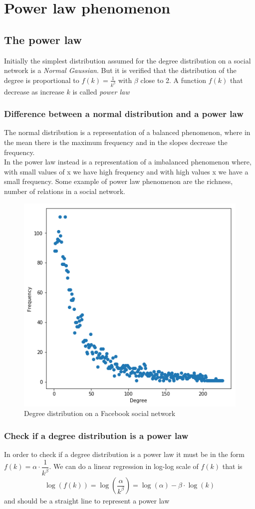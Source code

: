 \chapter{Power law phenomenon}
\section{The power law}
Initially the simplest distribution assumed for the degree distribution on a social network is a \textit{Normal Gaussian}. But it is verified that the distribution of the degree is proportional to $ f(k) = \frac{1}{k^\beta} $ with $ \beta  $ close to 2. A function $ f(k) $ that decrease as increase $ k $ is called \textit{power law}
\subsection{Difference between a normal distribution and a power law}
The normal distribution is a representation of a balanced phenomenon, where in the mean there is the maximum frequency and in the slopes decrease the frequency.\\
In the power law instead is a representation of a imbalanced phenomenon where, with small values of x we have high frequency and with high values x we have a small frequency. Some example of power law phenomenon are the richness, number of relations in a social network.
\begin{figure}[H]
	\centering
	\includegraphics[width=0.7\linewidth]{img/power_law_example}
	\caption{Degree distribution on a Facebook social network}
	\label{fig:powerlawexample}
\end{figure}
\subsection{Check if a degree distribution is a power law}
In order to check if a degree distribution is a power law it must be in the form $ f(k) = \alpha \cdot \dfrac{1}{k^{\beta}} $.
We can do a linear regression in log-log scale of $ f(k) $ that is
\begin{align*}
\log(f(k)) = \log\left(\dfrac{\alpha}{k^{\beta}}\right) = \log(\alpha) - \beta \cdot \log(k)
\end{align*}
and should be a straight line to represent a power law

